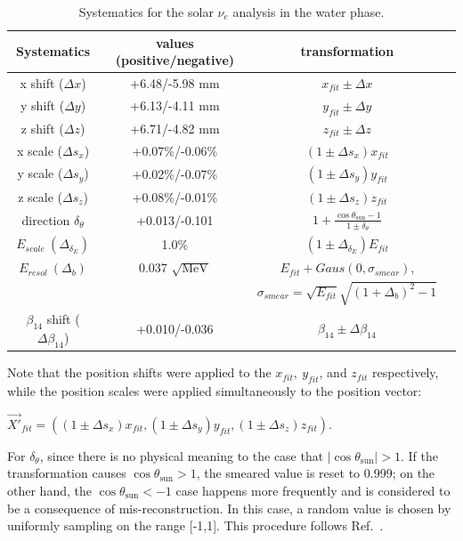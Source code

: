 \begin{table}[ht]
	\centering
	\caption{Systematics for the solar $\nu_e$ analysis in the water phase.\label{tab:solar_uncertainties}}
	
	\begin{tabular*}{150mm}{c@{\extracolsep{\fill}}ccc}
		\toprule
		Systematics & values (positive/negative) & transformation   \\
		\hline
		x shift ($\Delta x$) & +6.48/-5.98 mm  & $x_{fit}\pm \Delta x$ \\	
		y shift ($\Delta y$)& +6.13/-4.11 mm   & $y_{fit}\pm \Delta y$ \\
		z shift ($\Delta z$)& +6.71/-4.82 mm   & $z_{fit}\pm \Delta z$ \\
		x scale ($\Delta s_x$)& +0.07\%/-0.06\%  & $(1\pm \Delta s_x)x_{fit}$\\	
		y scale ($\Delta s_y$)& +0.02\%/-0.07\%  & $(1\pm \Delta s_y)y_{fit}$ \\
		z scale ($\Delta s_z$)& +0.08\%/-0.01\%  & $(1\pm \Delta s_z)z_{fit}$ \\
		direction $\delta_\theta$  & +0.013/-0.101 & $1+\frac{\cos\theta_\mathrm{sun}-1}{1\pm\delta_\theta}$\\
		$E_{scale}~(\Delta_{\delta_E})$ &  1.0\%  & $(1\pm \Delta_{\delta_E})E_{fit}$\\
		$E_{resol}~(\Delta_b)$ &  0.037 $\sqrt{\mathrm{MeV}}$  & $E_{fit}+Gaus(0,\sigma_{smear})$, \\
		& &$\sigma_{smear}=\sqrt{E_{fit}}\sqrt{(1+\Delta_b)^2-1}$\\
		$\beta_{14}$ shift ($\Delta \beta_{14}$) & +0.010/-0.036 & $\beta_{14}\pm \Delta \beta_{14}$\\
		\bottomrule
	\end{tabular*}
\end{table}

Note that the position shifts were applied to the $x_{fit},~y_{fit}$, and $z_{fit}$ respectively, while the position scales were applied simultaneously to the position vector: 

$\vec{X'}_{fit}=((1\pm \Delta s_x)x_{fit},(1\pm \Delta s_y)y_{fit},(1\pm \Delta s_z)z_{fit})$.

For $\delta_\theta$, since there is no physical meaning to the case that $\vert \cos\theta_\mathrm{sun} \vert >1$. If the transformation causes $\cos\theta_\mathrm{sun}>1$, the smeared value is reset to 0.999; on the other hand, the $\cos\theta_\mathrm{sun}<-1$ case happens more frequently and is considered to be a consequence of mis-reconstruction. In this case, a random value is chosen by uniformly sampling on the range [-1,1]. This procedure follows Ref.~\cite{waterunidoc}.

